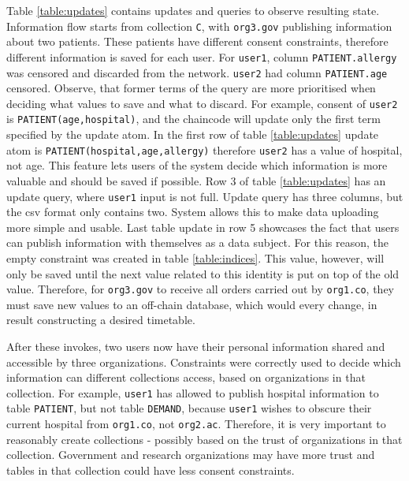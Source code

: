 \documentclass[12pt]{article}
\begin{document}
    Table \ref{table:updates} contains updates and queries to observe resulting state. Information flow starts from collection \lstinline{C}, with \lstinline{org3.gov} publishing information about two patients. These patients have different consent constraints, therefore different information is saved for each user. For \lstinline{user1}, column \lstinline{PATIENT.allergy} was censored and discarded from the network. \lstinline{user2} had column \lstinline{PATIENT.age} censored. Observe, that former terms of the query are more prioritised when deciding what values to save and what to discard. For example, consent of \lstinline{user2} is \lstinline{PATIENT(age,hospital)}, and the chaincode will update only the first term specified by the update atom. In the first row of table \ref{table:updates} update atom is \lstinline{PATIENT(hospital,age,allergy)} therefore \lstinline{user2} has a value of hospital, not age. This feature lets users of the system decide which information is more valuable and should be saved if possible. Row 3 of table \ref{table:updates} has an update query, where \lstinline{user1} input is not full. Update query has three columns, but the csv format only contains two. System allows this to make data uploading more simple and usable. Last table update in row 5 showcases the fact that users can publish information with themselves as a data subject. For this reason, the empty constraint was created in table \ref{table:indices}. This value, however, will only be saved until the next value related to this identity is put on top of the old value. Therefore, for \lstinline{org3.gov} to receive all orders carried out by \lstinline{org1.co}, they must save new values to an off-chain database, which would every change, in result constructing a desired timetable.

    After these invokes, two users now have their personal information shared and accessible by three organizations. Constraints were correctly used to decide which information can different collections access, based on organizations in that collection. For example, \lstinline{user1} has allowed to publish hospital information to table \lstinline{PATIENT}, but not table \lstinline{DEMAND}, because \lstinline{user1} wishes to obscure their current hospital from \lstinline{org1.co}, not \lstinline{org2.ac}. Therefore, it is very important to reasonably create collections - possibly based on the trust of organizations in that collection. Government and research organizations may have more trust and tables in that collection could have less consent constraints.
\end{document}
